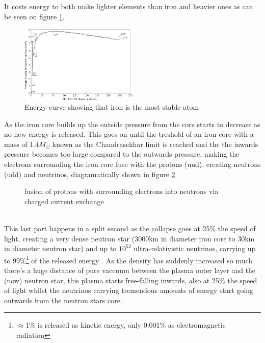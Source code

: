 \documentclass[11pt,a4paper,faculty=we,language=en,doctype=report]{cls/ugent-doc}
\begin{document}
It costs energy
to both make lighter elements than iron and heavier ones as can be seen on
figure \ref{fig:BindingEnergyCurve}.
\begin{figure}[!ht]
	\centering
	\includegraphics[width=0.5\textwidth]{Binding_energy_curve.png}
	\caption{Energy curve showing that iron is the most stable atom}
	\label{fig:BindingEnergyCurve}
\end{figure}
  As the iron core builds up the outside
pressure from the core starts to decrease as no new energy is released. This
goes on until  the treshold of an iron core with a mass of 1.4$M_\odot$ known
as the Chandrasekhar limit is reached and the the inwards pressure becomes too
large compared to the outwards pressure, making the electrons surrounding the
iron core fuse with the protons (uud), creating neutrons (udd) and neutrinos,
diagramatically shown in figure
\ref{fig:CoreFusion}.
\begin{figure}[h]
	\centering
	\caption{fusion of protons with surrounding electrons into neutrons via charged current exchange}
	\label{fig:CoreFusion}
\end{figure}\\
This last part happens in a split second as the collapse goes at 25\% the speed
of light, creating a very dense neutron star (3000km in diameter iron core to
30km in diameter neutron star) and up to $10^{52}$ ultra-relativistic
neutrinos, carrying up to 99\%\footnote{$\approx$1\% is released as kinetic energy, only 0.001\% as
electromagnetic radiation} of the released energy
\cite{Melson_2015}. As the density has suddenly increased so much
there's a huge distance of pure vaccuum between the plasma outer layer and the
(now) neutron star, this plasma starts free-falling inwards, also at 25\% the
speed of light whilst the neutrinos carrying tremendous amounts of energy start
going outwards from the neutron stars core.
\end{document}
